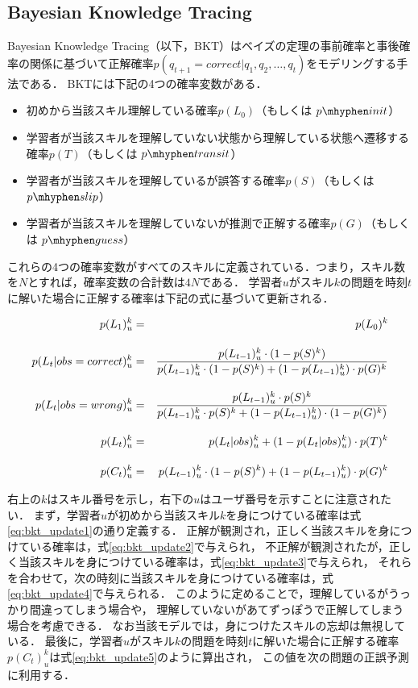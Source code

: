 \subsection{Bayesian Knowledge Tracing}
Bayesian Knowledge Tracing\cite{corbett1994knowledge}（以下，BKT）はベイズの定理の事前確率と事後確率の関係に基づいて正解確率$p(q_{t+1} = correct|q_1, q_2, \dots, q_t)$をモデリングする手法である．
BKTには下記の4つの確率変数がある．
\begin{itemize}
\item 初めから当該スキル理解している確率$p(L_0)$（もしくは $p\mhyphen init$）
\item 学習者が当該スキルを理解していない状態から理解している状態へ遷移する確率$p(T)$（もしくは $p\mhyphen transit$）
\item 学習者が当該スキルを理解しているが誤答する確率$p(S)$（もしくは $p\mhyphen slip$）
\item 学習者が当該スキルを理解していないが推測で正解する確率$p(G)$（もしくは $p\mhyphen guess$）
\end{itemize}
これらの4つの確率変数がすべてのスキルに定義されている．つまり，スキル数を$N$とすれば，確率変数の合計数は$4N$である．
学習者$u$がスキル$k$の問題を時刻$t$に解いた場合に正解する確率は下記の式に基づいて更新される．

\hspace*{-55pt}
\begin{eqnarray}
\label{eq:bkt_update1}
p(L_1)^{k}_{u} &=& p(L_0)^k \\[\eqnsp]
\label{eq:bkt_update2}
p(L_{t}|obs=correct)^{k}_{u} &=& \frac{ p(L_{t-1})^{k}_{u} \cdot (1 - p(S)^k) }{ p(L_{t-1})^{k}_{u} \cdot (1 - p(S)^k) + (1 - p(L_{t-1})^{k}_{u}) \cdot p(G)^k } \\[\eqnsp]
\label{eq:bkt_update3}
p(L_{t}|obs=wrong)^{k}_{u} &=& \frac{ p(L_{t-1})^{k}_{u} \cdot p(S)^k }{ p(L_{t-1})^{k}_{u} \cdot p(S)^k + (1 - p(L_{t-1})^{k}_{u}) \cdot (1 - p(G)^k) } \\[\eqnsp]
\label{eq:bkt_update4}
p(L_{t})^{k}_{u} &=& p(L_{t}|obs)^{k}_{u} + (1 - p(L_{t}|obs)^{k}_{u}) \cdot p(T)^k  \\[\eqnsp]
\label{eq:bkt_update5}
p(C_{t})^{k}_{u} &=& p(L_{t-1})^{k}_{u} \cdot (1 - p(S)^k) + (1 - p(L_{t-1})^k_{u}) \cdot p(G)^k
\end{eqnarray}
\endminipage\hfill
\vvspace
\vvspace


右上の$k$はスキル番号を示し，右下の$u$はユーザ番号を示すことに注意されたい．
まず，学習者$u$が初めから当該スキル$k$を身につけている確率は式\ref{eq:bkt_update1}の通り定義する．
正解が観測され，正しく当該スキルを身につけている確率は，式\ref{eq:bkt_update2}で与えられ，
不正解が観測されたが，正しく当該スキルを身につけている確率は，式\ref{eq:bkt_update3}で与えられ，
それらを合わせて，次の時刻に当該スキルを身につけている確率は，式\ref{eq:bkt_update4}で与えられる．
このように定めることで，理解しているがうっかり間違ってしまう場合や， 理解していないがあてずっぽうで正解してしまう場合を考慮できる．
なお当該モデルでは，身につけたスキルの忘却は無視している．
最後に，学習者$u$がスキル$k$の問題を時刻$t$に解いた場合に正解する確率$p(C_{t})^{k}_{u}$は式\ref{eq:bkt_update5}のように算出され，
この値を次の問題の正誤予測に利用する．
 
